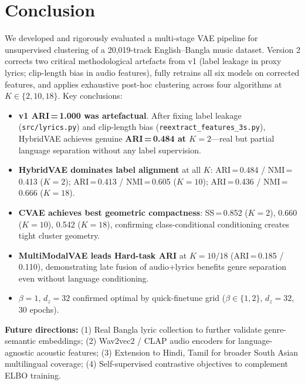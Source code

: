 \documentclass{article}
\begin{document}
\section{Conclusion}

We developed and rigorously evaluated a multi-stage VAE pipeline for unsupervised
clustering of a 20,019-track English--Bangla music dataset. Version 2 corrects two
critical methodological artefacts from v1 (label leakage in proxy lyrics; clip-length
bias in audio features), fully retrains all six models on corrected features, and
applies exhaustive post-hoc clustering across four algorithms at $K\!\in\!\{2,10,18\}$.
Key conclusions:

\begin{itemize}
    \item \textbf{v1 ARI\,=\,1.000 was artefactual}. After fixing label leakage
          (\texttt{src/lyrics.py}) and clip-length bias (\texttt{reextract\_features\_3s.py}),
          HybridVAE achieves genuine \textbf{ARI\,=\,0.484 at $K\!=\!2$}---real but
          partial language separation without any label supervision.
    \item \textbf{HybridVAE dominates label alignment} at all $K$:
          ARI\,=\,0.484 / NMI\,=\,0.413 ($K\!=\!2$);
          ARI\,=\,0.413 / NMI\,=\,0.605 ($K\!=\!10$);
          ARI\,=\,0.436 / NMI\,=\,0.666 ($K\!=\!18$).
    \item \textbf{CVAE achieves best geometric compactness}: SS\,=\,0.852 ($K\!=\!2$),
          0.660 ($K\!=\!10$), 0.542 ($K\!=\!18$), confirming class-conditional
          conditioning creates tight cluster geometry.
    \item \textbf{MultiModalVAE leads Hard-task ARI} at $K\!=\!10/18$
          (ARI\,=\,0.185 / 0.110), demonstrating late fusion of audio+lyrics benefits
          genre separation even without language conditioning.
    \item $\beta\!=\!1$, $d_z\!=\!32$ confirmed optimal by quick-finetune grid
          ($\beta\!\in\!\{1,2\}$, $d_z\!=\!32$, 30 epochs).
\end{itemize}

\textbf{Future directions:}
(1) Real Bangla lyric collection to further validate genre-semantic embeddings;
(2) Wav2vec2 / CLAP audio encoders for language-agnostic acoustic features;
(3) Extension to Hindi, Tamil for broader South Asian multilingual coverage;
(4) Self-supervised contrastive objectives to complement ELBO training.
\end{document}
